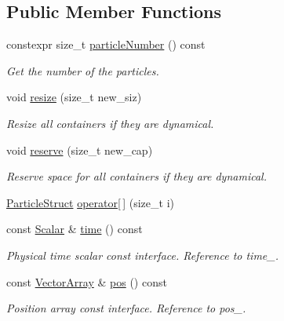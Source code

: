 \subsection*{Public Member Functions}
\begin{DoxyCompactItemize}
\item 
constexpr size\+\_\+t \mbox{\hyperlink{class_space_h_1_1_vel_indep_particles_a12c9a60ac96d922444e337b95749c806}{particle\+Number}} () const
\begin{DoxyCompactList}\small\item\em Get the number of the particles. \end{DoxyCompactList}\item 
void \mbox{\hyperlink{class_space_h_1_1_vel_indep_particles_a4f3fe32c740780625671b9a6a0737004}{resize}} (size\+\_\+t new\+\_\+siz)
\begin{DoxyCompactList}\small\item\em Resize all containers if they are dynamical. \end{DoxyCompactList}\item 
void \mbox{\hyperlink{class_space_h_1_1_vel_indep_particles_acfc418ed2bc892b9932c606853570e77}{reserve}} (size\+\_\+t new\+\_\+cap)
\begin{DoxyCompactList}\small\item\em Reserve space for all containers if they are dynamical. \end{DoxyCompactList}\item 
\mbox{\hyperlink{class_space_h_1_1_vel_indep_particles_ab20a7efcdf5e90bd1d073eb73be59120}{Particle\+Struct}} \mbox{\hyperlink{class_space_h_1_1_vel_indep_particles_ae9bb5b41cb491b23df12c819d253dcdb}{operator\mbox{[}$\,$\mbox{]}}} (size\+\_\+t i)
\item 
const \mbox{\hyperlink{class_space_h_1_1_vel_indep_particles_aeb47d8131b30ed790320ff634f0d6af1}{Scalar}} \& \mbox{\hyperlink{class_space_h_1_1_vel_indep_particles_a417f0f6f338f78fac494a2f5bb471d1d}{time}} () const
\begin{DoxyCompactList}\small\item\em Physical time scalar const interface. Reference to time\+\_\+. \end{DoxyCompactList}\item 
const \mbox{\hyperlink{class_space_h_1_1_vel_indep_particles_aa9983058940249df8b00fa800e8cbad2}{Vector\+Array}} \& \mbox{\hyperlink{class_space_h_1_1_vel_indep_particles_a12ffb071816842a3d31eb11d49ab5b55}{pos}} () const
\begin{DoxyCompactList}\small\item\em Position array const interface. Reference to pos\+\_\+. \end{DoxyCompactList}\item 

\end{DoxyCompactItemize}
